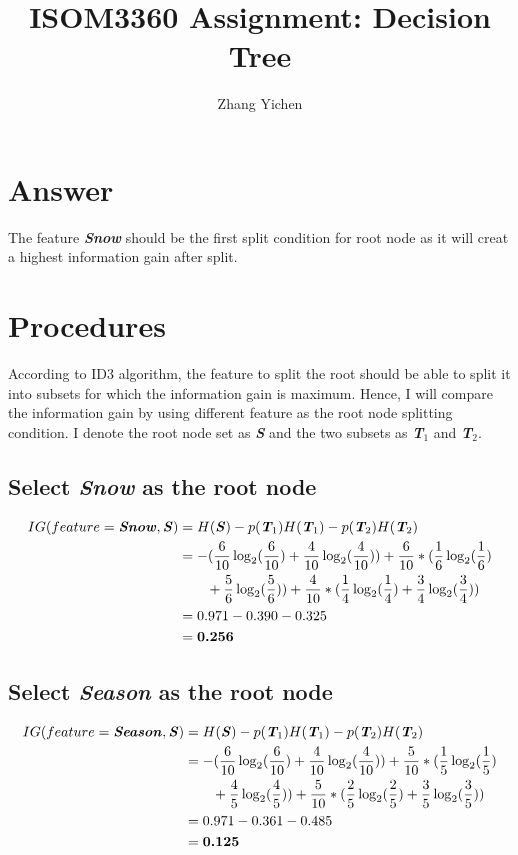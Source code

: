 \documentclass{article}
\title{ISOM3360 Assignment: Decision Tree}
\author{Zhang Yichen}
\begin{document}
\maketitle

\section{Answer} 
\noindent The feature \textbf{\textit{Snow}} should be the first split condition for root node as it will creat a highest information gain after split.

\section{Procedures}
According to ID3 algorithm, the feature to split the root should be able to split it into subsets for which the information gain is maximum. Hence, I will compare the information gain by using different feature as the root node splitting condition. I denote the root node set as \textbf{\textit{S}} and the two subsets as \textbf{\textit{T$_1$}} and \textbf{\textit{T$_2$}}.


\subsection*{Select \textbf{\textit{Snow}} as the root node} 
\begin{align*}
        IG(feature = \textbf{\textit{Snow}}, \textbf{\textit{S}}) &= H(\textbf{\textit{S}}) - p(\textbf{\textit{T$_1$}})H(\textbf{\textit{T$_1$}}) - p(\textbf{\textit{T$_2$}})H(\textbf{\textit{T$_2$}}) \\
        &= -(\frac{6}{10}\log_2(\frac{6}{10})+\frac{4}{10}\log_2(\frac{4}{10})) + \frac{6}{10}*(\frac{1}{6}\log_2(\frac{1}{6}) \nonumber \\
        & \qquad +\frac{5}{6}\log_2(\frac{5}{6})) + \frac{4}{10}*(\frac{1}{4}\log_2(\frac{1}{4})+\frac{3}{4}\log_2(\frac{3}{4})) \\
        &= 0.971 - 0.390 - 0.325 \\
        &= \textbf{0.256}
\end{align*}
\subsection*{Select \textbf{\textit{Season}} as the root node}
\begin{align*}
    IG(feature = \textbf{\textit{Season}}, \textbf{\textit{S}}) &= H(\textbf{\textit{S}}) - p(\textbf{\textit{T$_1$}})H(\textbf{\textit{T$_1$}}) - p(\textbf{\textit{T$_2$}})H(\textbf{\textit{T$_2$}}) \\
    &= -(\frac{6}{10}\log_2(\frac{6}{10})+\frac{4}{10}\log_2(\frac{4}{10})) + \frac{5}{10}*(\frac{1}{5}\log_2(\frac{1}{5}) \nonumber \\
    & \qquad +\frac{4}{5}\log_2(\frac{4}{5})) + \frac{5}{10}*(\frac{2}{5}\log_2(\frac{2}{5})+\frac{3}{5}\log_2(\frac{3}{5})) \\
    &= 0.971 - 0.361 - 0.485 \\
    &= \textbf{0.125}
\end{align*} 
\end{document}
